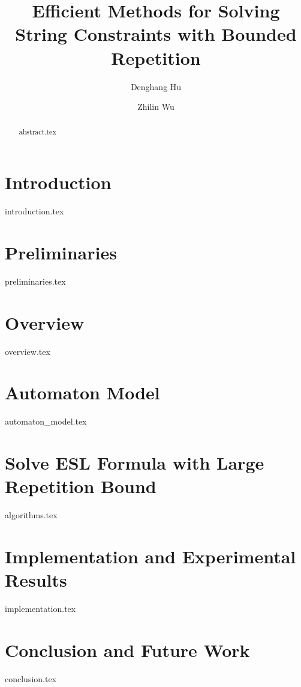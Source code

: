 \documentclass[runningheads]{llncs}
\begin{document}
\title{Efficient Methods for Solving String Constraints with Bounded Repetition}

\author{Denghang Hu \and
  Zhilin Wu}


\maketitle

\begin{abstract}
{abstract.tex}
\end{abstract}


\section{Introduction} \label{sec:intro}
{introduction.tex}

\section{Preliminaries} \label{sec:pre}
{preliminaries.tex}

\section{Overview} \label{sec:overview}
{overview.tex}

\section{Automaton Model} \label{sec:automaton}
{automaton_model.tex}

\section{Solve ESL Formula with Large Repetition Bound} \label{sec:algorithm}
{algorithms.tex}

\section{Implementation and Experimental Results} \label{sec:implementation}
{implementation.tex}

\section{Conclusion and Future Work} \label{sec:conclu}
{conclusion.tex}



\end{document}
